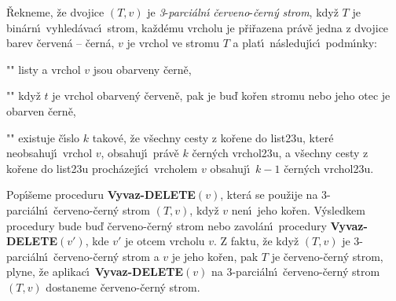 \flushpar\v Rekneme, \v ze dvojice $\left(T,v\right)$ je \emph{3}-\emph{parci\'aln\'\i} 
\emph{\v cerveno}-\emph{\v cern\'y} \emph{strom}, kdy\v z $T$ je bin\'arn\'\i\ 
vy\-hled\'avac\'\i\ strom, ka\v zd\'emu vrcholu je p\v ri\-\v razena pr\'av\v e jedna z 
dvojice barev \v cerven\'a -- \v cern\'a, $v$ je vrchol ve stromu $
T$ a 
plat\'\i\ n\'asleduj\'\i c\'\i\ podm\'\i nky: 
\roster
\item"{}"
listy a vrchol $v$ jsou obarveny \v cern\v e,
\item"{}"
kdy\v z $t$ je vrchol obarven\'y \v cerven\v e, pak je bu\v d ko\v ren 
stromu nebo jeho otec je obarven \v cern\v e,
\item"{}"
existuje \v c\'\i slo $k$ takov\'e, \v ze v\v sechny cesty z ko\v rene do 
list\accent23u, kter\'e neobsahuj\'\i\ vrchol $v$, obsahuj\'\i\ pr\'av\v e 
$k$ \v cer\-n\'ych vrchol\accent23u, a v\v sechny cesty z ko\v rene do 
list\accent23u proch\'a\-ze\-j\'\i\-c\'\i\ vrcholem $v$ obsahuj\'\i\ $
k-1$ \v cern\'ych 
vrchol\accent23u.
\endroster
\medskip

\flushpar Pop\'\i\v seme proceduru {\bf Vyvaz-DELETE$\left(v\right)$}, kter\'a se 
pou\v zije na 3-parci\'aln\'\i\ \v cerveno-\v cern\'y strom $\left(T,v\right)$, kdy\v z $
v$ nen\'\i\ jeho 
ko\v ren.  V\'ysledkem procedury bude bu\v d \v cerveno-\v cern\'y strom 
nebo zavol\'an\'\i\ procedury {\bf Vyvaz-DELE\-TE$\left(v'\right)$}, kde $v'$ je otcem 
vrcholu $v$.  Z faktu, \v ze kdy\v z $\left(T,v\right)$ je 3-parci\'aln\'\i\ \v cerveno-\v cern\'y 
strom a $v$ je jeho ko\v ren, pak $T$ je \v cerveno-\v cern\'y strom, plyne, 
\v ze aplikac\'\i\ {\bf Vyvaz-DELETE$\left(v\right)$} na 3-parci\'aln\'\i\ \v cerveno-\v cern\'y strom 
$\left(T,v\right)$ dostaneme \v cerveno-\v cern\'y strom.  
\medskip

